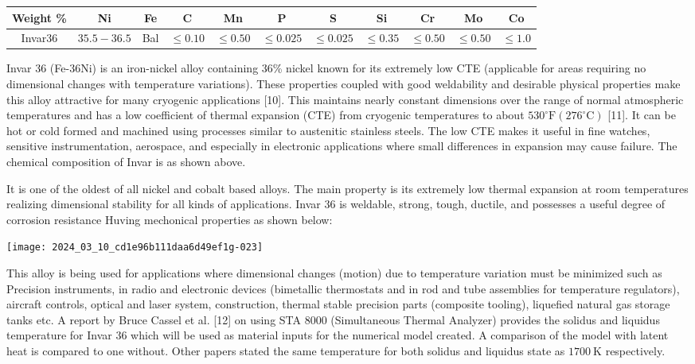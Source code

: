 \documentclass[10pt]{article}
\begin{document}
\begin{center}
\begin{tabular}{|c|c|c|c|c|c|c|c|c|c|c|}
\hline
Weight \% & Ni & Fe & C & Mn & P & S & Si & Cr & Mo & Co \\
\hline
Invar36 & $35.5-36.5$ & Bal & $\leq 0.10$ & $\leq 0.50$ & $\leq 0.025$ & $\leq 0.025$ & $\leq 0.35$ & $\leq 0.50$ & $\leq 0.50$ & $\leq 1.0$ \\
\hline
\end{tabular}
\end{center}

Invar 36 (Fe-36Ni) is an iron-nickel alloy containing 36\% nickel known for its extremely low CTE (applicable for areas requiring no dimensional changes with temperature variations). These properties coupled with good weldability and desirable physical properties make this alloy attractive for many cryogenic applications [10]. This maintains nearly constant dimensions over the range of normal atmospheric temperatures and has a low coefficient of thermal expansion (CTE) from cryogenic temperatures to about $530^{\circ} \mathrm{F}\left(276^{\circ} \mathrm{C}\right)$ [11]. It can be hot or cold formed and machined using processes similar to austenitic stainless steels. The low CTE makes it useful in fine watches, sensitive instrumentation, aerospace, and especially in electronic applications where small differences in expansion may cause failure. The chemical composition of Invar is as shown above.

It is one of the oldest of all nickel and cobalt based alloys. The main property is its extremely low thermal expansion at room temperatures realizing dimensional stability for all kinds of applications. Invar 36 is weldable, strong, tough, ductile, and possesses a useful degree of corrosion resistance Huving mechonical properties as shown below:

\begin{center}
\texttt{[image: 2024\_03\_10\_cd1e96b111daa6d49ef1g-023]}
\end{center}

This alloy is being used for applications where dimensional changes (motion) due to temperature variation must be minimized such as Precision instruments, in radio and electronic devices (bimetallic thermostats and in rod and tube assemblies for temperature regulators), aircraft controls, optical and laser system, construction, thermal stable precision parts (composite tooling), liquefied natural gas storage tanks etc. A report by Bruce Cassel et al. [12] on using STA 8000 (Simultaneous Thermal Analyzer) provides the solidus and liquidus temperature for Invar 36 which will be used as material inputs for the numerical model created. A comparison of the model with latent heat is compared to one without. Other papers stated the same temperature for both solidus and liquidus state as $1700 \mathrm{~K}$ respectively.
\end{document}
